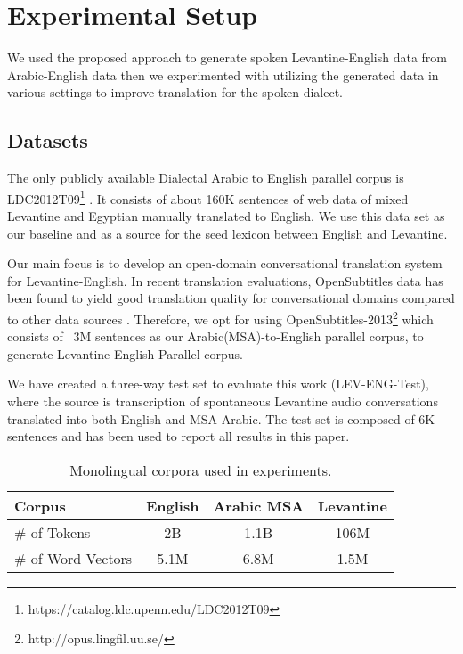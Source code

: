 \documentclass[a4paper]{article}
\begin{document}
\section{Experimental Setup}
\label{sec:exp}

We used the proposed approach to generate spoken Levantine-English data from Arabic-English data then we experimented with utilizing the generated data  in various settings to improve translation for the spoken dialect. 



\subsection{Datasets}
\label{sec:data}

The only publicly available Dialectal Arabic to English parallel corpus is LDC2012T09\footnote{https://catalog.ldc.upenn.edu/LDC2012T09} \cite{ZbibMDSMSMZC12}. It consists of about 160K sentences of web data of mixed Levantine and Egyptian manually translated to English. We use this data set as  our baseline and as a source for the seed lexicon between English and Levantine.

Our main focus is to develop an open-domain conversational   translation system for Levantine-English.  In recent translation evaluations, OpenSubtitles data \cite{TIEDEMANN12} has been found to yield good translation quality for conversational domains compared to other data sources \cite{umdiwslt}. Therefore, we opt for using OpenSubtitles-2013\footnote{http://opus.lingfil.uu.se/} which consists of ~3M sentences as our Arabic(MSA)-to-English parallel corpus, to generate Levantine-English Parallel corpus.


We have created a three-way test set to evaluate this work (LEV-ENG-Test), where the source is transcription of spontaneous Levantine audio conversations translated  into both English and MSA Arabic. The test set is composed of 6K sentences and has been used to report all results in this paper.


\begin{table}
\begin{center}
\begin{tabular}{lccc}
Corpus & English & Arabic MSA & Levantine \\
\hline
\# of Tokens & 2B & 1.1B & 106M\\
\# of Word Vectors & 5.1M & 6.8M &1.5M 
\end{tabular}
\end{center}
\caption{Monolingual corpora used in experiments.\label{tab:mono}}
\end{table}
\end{document}
